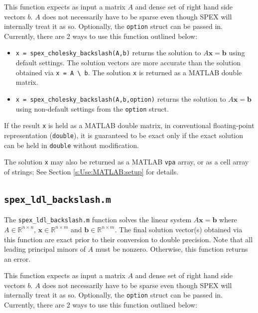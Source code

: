 \documentclass[12pt,oneside]{book}
\theoremstyle{definition}
\renewcommand{\b}{\mathbf{b}}
\newcommand{\x}{\mathbf{x}}
\begin{document}
This function expects as input a matrix $A$ and dense set of
right hand side vectors $b$. $A$ does not necessarily have to be sparse
even though SPEX will internally treat it as so.
Optionally, the \verb|option| struct can be passed in.
Currently, there are 2 ways to use this function outlined below:

\begin{itemize}

\item \verb|x = spex_cholesky_backslash(A,b)| returns the solution to $A \x =
\b$ using default settings. The solution vectors are more accurate than
the solution obtained via \verb|x = A \ b|.  The solution \verb|x| is
returned as a MATLAB double matrix.

\item \verb|x = spex_cholesky_backslash(A,b,option)| returns the solution to $A \x =
\b$ using non-default settings from the \verb|option| struct.

\end{itemize}

If the result \verb|x| is held as a MATLAB double matrix, in conventional
floating-point representation (\verb|double|), it is guaranteed to be exact
only if the exact solution can be held in \verb|double| without modification.

The solution \verb|x| may also be returned as a MATLAB \verb|vpa| array, or as
a cell array of strings; See Section \ref{s:Use:MATLAB:setup} for details.

\subsection{\texttt{spex\_ldl\_backslash.m}}
The \verb|spex_ldl_backslash.m| function solves the linear system $A \x = \b$ where
$A \in \mathbb{R}^{n \times n}$, $\x \in \mathbb{R}^{n \times m}$ and $\b \in
\mathbb{R}^{n \times m}$. The final solution vector(s) obtained via this
function are exact prior to their conversion to double precision. Note that
all leading principal minors of $A$ must be nonzero.
Otherwise, this function returns an error.

This function expects as input a matrix $A$ and dense set of
right hand side vectors $b$. $A$ does not necessarily have to be sparse
even though SPEX will internally treat it as so.
Optionally, the \verb|option| struct can be passed in.
Currently, there are 2 ways to use this function outlined below:
\end{document}
